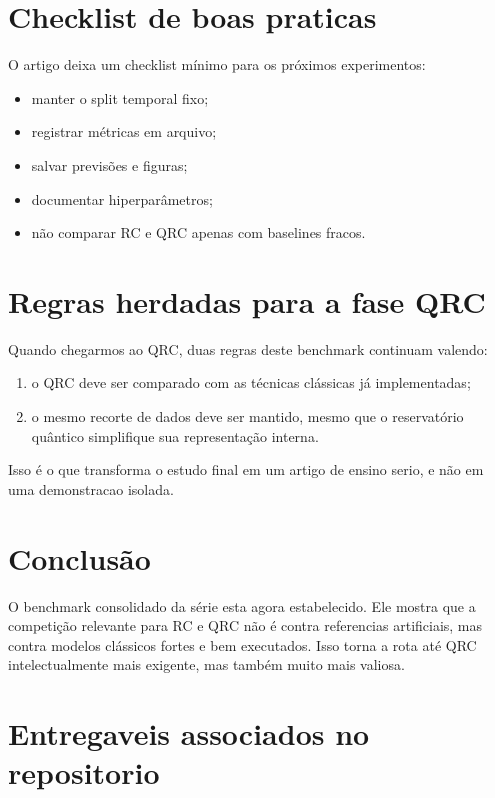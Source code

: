 \documentclass[12pt]{article}
\providecommand{\tightlist}{%
              \setlength{\itemsep}{0pt}\setlength{\parskip}{0pt}}
\begin{document}
\section{Checklist de boas praticas}\label{9-checklist-de-boas-praticas}

O artigo deixa um checklist mínimo para os próximos experimentos:

\begin{itemize}
\tightlist
\item
  manter o split temporal fixo;
\item
  registrar métricas em arquivo;
\item
  salvar previsões e figuras;
\item
  documentar hiperparâmetros;
\item
  não comparar RC e QRC apenas com baselines fracos.
\end{itemize}

\section{Regras herdadas para a fase QRC}\label{10-regras-herdadas-para-a-fase-qrc}

Quando chegarmos ao QRC, duas regras deste benchmark continuam valendo:

\begin{enumerate}
\def\labelenumi{\arabic{enumi}.}
\tightlist
\item
  o QRC deve ser comparado com as técnicas clássicas já implementadas;
\item
  o mesmo recorte de dados deve ser mantido, mesmo que o reservatório quântico simplifique sua representação interna.
\end{enumerate}

Isso é o que transforma o estudo final em um artigo de ensino serio, e não em uma demonstracao isolada.

\section{Conclusão}\label{11-conclusuxe3o}

O benchmark consolidado da série esta agora estabelecido. Ele mostra que a competição relevante para RC e QRC não é contra referencias artificiais, mas contra modelos clássicos fortes e bem executados. Isso torna a rota até QRC intelectualmente mais exigente, mas também muito mais valiosa.

\section*{Entregaveis associados no repositorio}\label{entregaveis-associados-no-repositorio}
\end{document}
